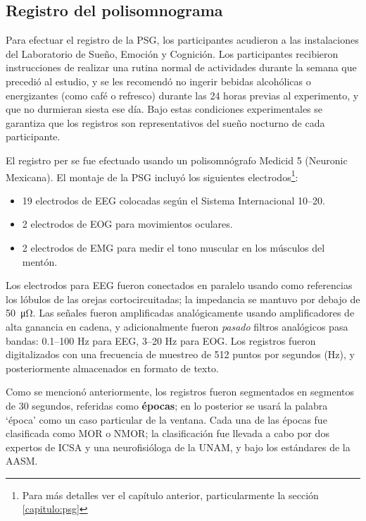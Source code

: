 \documentclass[12pt,letterpaper]{book}
\begin{document}
\subsection{Registro del polisomnograma}

Para efectuar el registro de la PSG, los participantes acudieron a las instalaciones del Laboratorio de Sueño, Emoción y Cognición. 
%
Los participantes recibieron instrucciones de realizar una rutina normal de actividades durante la semana que precedió al estudio, y se les recomendó no ingerir bebidas alcohólicas o energizantes (como café o refresco) durante las 24 horas previas al experimento, y que no durmieran siesta ese día.
%
Bajo estas condiciones experimentales se garantiza que los registros son representativos del sueño nocturno de cada participante.

El registro per se fue efectuado usando un polisomnógrafo Medicid 5 (Neuronic Mexicana). El montaje de la PSG incluyó los siguientes electrodos\footnote{Para más detalles ver el capítulo anterior, particularmente la sección \ref{capitulo:psg}}:
\begin{itemize}
\item 19 electrodos de EEG colocadas según el Sistema Internacional 10--20.
\item 2 electrodos de EOG para movimientos oculares.
\item 2 electrodos de EMG para medir el tono muscular en los músculos del mentón.
\end{itemize}

Los electrodos para EEG fueron conectados en paralelo usando como referencias los lóbulos de las orejas cortocircuitadas; la impedancia se mantuvo por debajo de \SI{50}{\micro\ohm}.
%
Las señales fueron amplificadas analógicamente usando amplificadores de alta ganancia en cadena, 
y adicionalmente fueron \textit{pasado} filtros analógicos pasa bandas: 0.1--100 Hz 
para EEG, 3--20 Hz para EOG. 
%
Los registros fueron digitalizados con una frecuencia de muestreo de 512 puntos por segundos (Hz), y posteriormente almacenados en formato de texto.

Como se mencionó anteriormente, los registros fueron segmentados en segmentos de 30 segundos, referidas como \textbf{épocas}; en lo posterior se usará la palabra `época' como un caso particular de la ventana.
%
Cada una de las épocas fue clasificada como MOR o NMOR; la clasificación fue llevada a cabo por dos expertos de ICSA y una neurofisióloga de la UNAM, y bajo los estándares de la AASM.
\end{document}
